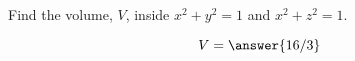 \documentclass{ximera}
\author{David Guichard \and Neal Koblitz \and H. Jerome Keisler \and Albert Scheller \and Barry Balof \and Mike Wills \and Matthew Carr}
\begin{document}
\begin{exercise}





Find the volume, $V$, inside $x^2+y^2=1$ and $x^2+z^2=1$.

\begin{prompt}
\[
V=\answer{16/3}
\]
\end{prompt}



\end{exercise}
\end{document}
